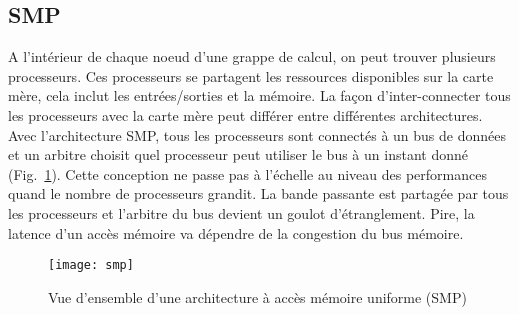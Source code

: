 \subsection{SMP}
A l'intérieur de chaque noeud d'une grappe de calcul, on peut trouver plusieurs processeurs.
%
Ces processeurs se partagent les ressources disponibles sur la carte mère, cela inclut les entrées/sorties et la mémoire.
%
La façon d'inter-connecter tous les processeurs avec la carte mère peut différer entre différentes architectures.
%
Avec l'architecture SMP, tous les processeurs sont connectés à un bus de données et un arbitre choisit quel processeur peut utiliser le bus à un instant donné (Fig.~\ref{fig:smp}).
%
Cette conception ne passe pas à l'échelle au niveau des performances quand le nombre de processeurs grandit.
%
La bande passante est partagée par tous les processeurs et l'arbitre du bus devient un goulot d'étranglement.
%
Pire, la latence d'un accès mémoire va dépendre de la congestion du bus mémoire.

\begin{figure}[!ht]
        \centering
        \texttt{[image: smp]}
        \caption{Vue d'ensemble d'une architecture à accès mémoire uniforme (SMP)}
        \label{fig:smp}
\end{figure}
